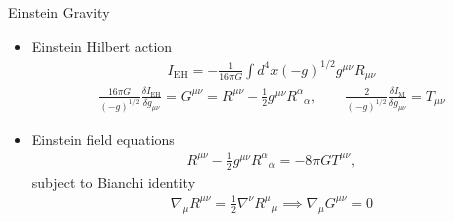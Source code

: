 \documentclass[8pt,aspectratio=1610]{beamer}
\begin{document}

\begin{frame}{Einstein Gravity}
	\begin{itemize}
		\item 	Einstein Hilbert action
		\begin{eqnarray}
		I_{\text{EH}} = -\frac{1}{16\pi G} \int d^4x (-g)^{1/2}  g^{\mu\nu}R_{\mu\nu}
		\end{eqnarray}
		\begin{eqnarray}
		\frac{16\pi G}{(-g)^{1/2}} \frac{\delta I_{\text{EH}}}{\delta g_{\mu\nu}}= G^{\mu\nu} = R^{\mu\nu} - \frac{1}{2}g^{\mu\nu}R^\alpha{}_\alpha,
		\qquad
		\frac{2}{(-g)^{1/2}} \frac{ \delta I_\text{M}}{\delta g_{\mu\nu}} = T_{\mu\nu}
		\end{eqnarray}
		\item Einstein field equations
		\begin{eqnarray}
		R^{\mu\nu} - \frac{1}{2}g^{\mu\nu}R^\alpha{}_\alpha = -8\pi G T^{\mu\nu},
		\label{EinEOM}
		\end{eqnarray}
		subject to Bianchi identity
		\begin{eqnarray}
		\nabla_\mu R^{\mu\nu} = \frac{1}{2}\nabla^\nu R^\mu{}_\mu \implies \nabla_\mu G^{\mu\nu} = 0
		\end{eqnarray}
	\end{itemize}
\end{frame}

\end{document}
